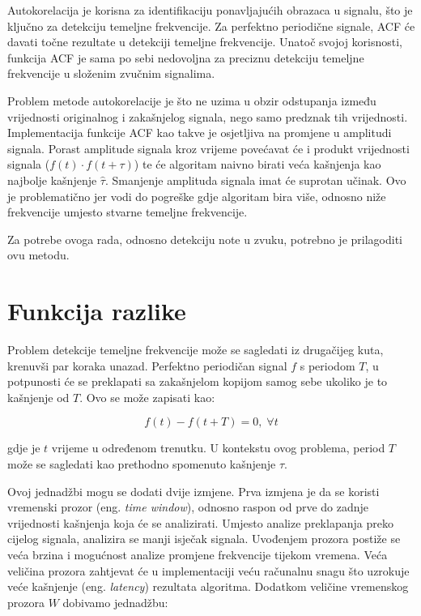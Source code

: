 \documentclass[times, utf8, diplomski, numeric]{fer}
\begin{document}
Autokorelacija je korisna za identifikaciju ponavljajućih obrazaca u signalu, što je ključno za detekciju temeljne frekvencije. Za perfektno periodične signale, ACF će davati točne rezultate u detekciji temeljne frekvencije. Unatoč svojoj korisnosti, funkcija ACF je sama po sebi nedovoljna za preciznu detekciju temeljne frekvencije u složenim zvučnim signalima.

Problem metode autokorelacije je što ne uzima u obzir odstupanja između vrijednosti originalnog i zakašnjelog signala, nego samo predznak tih vrijednosti. Implementacija funkcije ACF kao takve je osjetljiva na promjene u amplitudi signala. Porast amplitude signala kroz vrijeme povećavat će i produkt vrijednosti signala ($f(t) \cdot f(t + \tau)$) te će algoritam naivno birati veća kašnjenja kao najbolje kašnjenje $\hat{\tau}$. Smanjenje amplituda signala imat će suprotan učinak. Ovo je problematično jer vodi do pogreške gdje algoritam bira više, odnosno niže frekvencije umjesto stvarne temeljne frekvencije.

Za potrebe ovoga rada, odnosno detekciju note u zvuku, potrebno je prilagoditi ovu metodu.
\clearpage
\section{Funkcija razlike}
%
Problem detekcije temeljne frekvencije može se sagledati iz drugačijeg kuta, krenuvši par koraka unazad. Perfektno periodičan signal $f$ s periodom $T$, u potpunosti će se preklapati sa zakašnjelom kopijom samog sebe ukoliko je to kašnjenje od $T$. Ovo se može zapisati kao:

\begin{equation}
	f(t) - f(t + T) = 0, \; \forall t
\end{equation}

gdje je $t$ vrijeme u određenom trenutku. U kontekstu ovog problema, period $T$ može se sagledati kao prethodno spomenuto kašnjenje $\tau$.

Ovoj jednadžbi mogu se dodati dvije izmjene. Prva izmjena je da se koristi vremenski prozor (eng. \textit{time window}), odnosno raspon od prve do zadnje vrijednosti kašnjenja koja će se analizirati. Umjesto analize preklapanja preko cijelog signala, analizira se manji isječak signala. Uvođenjem prozora postiže se veća brzina i mogućnost analize promjene frekvencije tijekom vremena. Veća veličina prozora zahtjevat će u implementaciji veću računalnu snagu što uzrokuje veće kašnjenje (eng. \textit{latency}) rezultata algoritma. Dodatkom veličine vremenskog prozora $W$ dobivamo jednadžbu:
\end{document}
